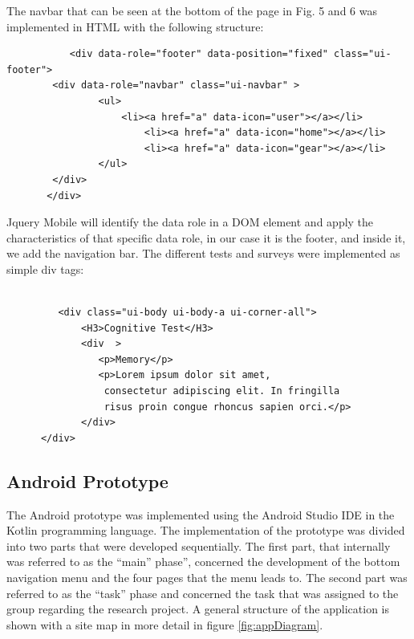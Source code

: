 \documentclass{article}
\begin{document}
The navbar that can be seen at the bottom of the page in Fig. 5 and 6 was implemented in HTML with the following structure: 

\begin{verbatim}
           <div data-role="footer" data-position="fixed" class="ui-footer">         
       	<div data-role="navbar" class="ui-navbar" >
            	<ul>
                  	<li><a href="a" data-icon="user"></a></li>
                        <li><a href="a" data-icon="home"></a></li>
                        <li><a href="a" data-icon="gear"></a></li>
            	</ul>
       	</div>
       </div>
\end{verbatim}
Jquery Mobile will identify the data role in a DOM element and apply the characteristics of that specific data role, in our case it is the footer, and inside it, we add the navigation bar.
The different tests and surveys were implemented as simple div tags: 

\begin{verbatim}
    
         <div class="ui-body ui-body-a ui-corner-all">   
             <H3>Cognitive Test</H3>
             <div  >
             	<p>Memory</p>
             	<p>Lorem ipsum dolor sit amet, 
             	 consectetur adipiscing elit. In fringilla 
             	 risus proin congue rhoncus sapien orci.</p>
     		 </div>       
      </div>
\end{verbatim}

\subsection{Android Prototype}
The Android prototype was implemented using the Android Studio IDE in the Kotlin programming language. The implementation of the prototype was divided into two parts that were developed sequentially. The first part, that internally was referred to as the “main” phase”, concerned the development of the bottom navigation menu and the four pages that the menu leads to. The second part was referred to as the “task” phase and concerned the task that was assigned to the group regarding the research project. A general structure of the application is shown with a site map in more detail in figure \ref{fig:appDiagram}.
\end{document}
